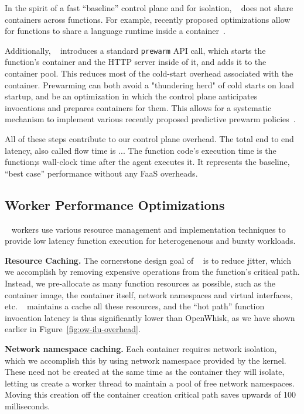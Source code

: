 In the spirit of a fast ``baseline'' control plane and for isolation, \sysname~ does not share containers across functions.
For example, recently proposed optimizations allow for functions to share a language runtime inside a container~\cite{}. 

Additionally, \sysname~ introduces a standard \texttt{prewarm}  API call, which starts the function's container and the HTTP server inside of it, and adds it to the container pool.
This reduces most of the cold-start overhead associated with the container.
Prewarming can both avoid a "thundering herd" of cold starts on load startup, and be an optimization in which the control plane anticipates invocations and prepares containers for them. 
This allows for a systematic mechanism to implement various recently proposed predictive prewarm policies~\cite{zhou2022aquatope, icebreaker, shahrad,..}. 


All of these steps contribute to our control plane overhead.
The total end to end latency, also called flow time is ...
The function code's execution time is the function;s wall-clock time after the agent executes it. It represents the baseline, ``best case'' performance without any FaaS overheads. 


\subsection{Worker Performance Optimizations}

\sysname~ workers use various resource management and implementation techniques to provide low latency function execution for heterogenenous and bursty workloads.

\noindent \textbf{Resource Caching.}
The cornerstone design goal of \sysname~ is to reduce jitter, which we accomplish by removing expensive operations from the function's critical path.
Instead, we pre-allocate as many function resources as possible, such as the container image, the container itself, network namespaces and virtual interfaces, etc.
\sysname~ maintains a cache all these resources, and the ``hot path'' function invocation latency is thus significantly lower than OpenWhisk, as we have shown earlier in Figure~\ref{fig:ow-ilu-overhead}.


\textbf{Network namespace caching.}
Each container requires network isolation, which we accomplish this by using network namespace provided by the kernel. 
These need not be created at the same time as the container they will isolate, letting us create a worker thread to maintain a pool of free network namespaces.
Moving this creation off the container creation critical path saves upwards of 100 milliseconds.

